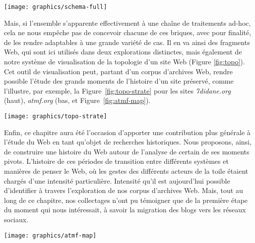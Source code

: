 \documentclass[symmetric,justified,marginals=raggedouter]{tufte-book}
\begin{document}
\begin{figure*}[hbtp]%
  \texttt{[image: graphics/schema-full]}
  \caption{Résumé des diverses opérations mises en place lors des explorations \protect\ref{sec:6_blogs} et \protect\ref{sec:6_printemps}, avec distinction entre approches automatique et manuelle}
  \label{fig:schema-full}
\end{figure*}

Mais, si l'ensemble s'apparente effectivement à une chaîne de traitements ad-hoc, cela ne nous empêche pas de concevoir chacune de ces briques, avec pour finalité, de les rendre adaptables à une grande variété de cas. Il en va ainsi des fragments Web, qui sont ici utilisés dans deux explorations distinctes, mais également de notre système de visualisation de la topologie d'un site Web (Figure \ref{fig:topo}). Cet outil de visualisation peut, partant d'un corpus d'archives Web, rendre possible l'étude des grands moments de l'histoire d'un site préservé, comme l'illustre, par exemple, la Figure~\ref{fig:topo-strate} pour les sites \textit{7didane.org} (haut), \textit{atmf.org} (bas, et Figure~\ref{fig:atmf-map}).

\begin{figure*}%
  \texttt{[image: graphics/topo-strate]}
  \caption{vue de l'évolution de la structure des sites \textit{7didane.org} (haut), \textit{atmf.org} (bas)}
  \label{fig:topo-strate}
\end{figure*}

\noindent Enfin, ce chapitre aura été l'occasion d'apporter une contribution plus générale à l'étude du Web en tant qu'objet de recherches historiques. Nous proposons, ainsi, de construire une histoire du Web autour de l'analyse de certain de ses moments pivots. L'histoire de ces périodes de transition entre différents systèmes et manières de penser le Web, où les gestes des différents acteurs de la toile étaient chargés d'une intensité particulière. Intensité qu'il est aujourd'hui possible d'identifier à travers l'exploration de nos corpus d'archives Web. Mais, tout au long de ce chapitre, nos collectages n'ont pu témoigner que de la première étape du moment qui nous intéressait, à savoir la migration des blogs vers les réseaux sociaux.

\begin{marginfigure}%
  \texttt{[image: graphics/atmf-map]}
  \vspace*{0.2cm}  
  \caption{\textit{atmf.org} (rouge) dans l'e-Diaspora marocaine}
  \label{fig:atmf-map}
\end{marginfigure} 
\end{document}
